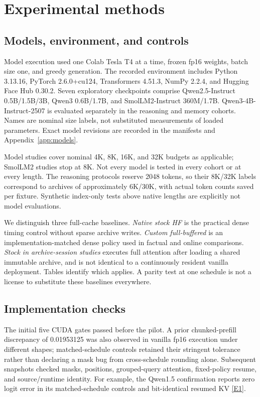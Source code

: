 \documentclass[11pt,letterpaper]{article}
\newcommand{\ev}[1]{\hyperref[app:evidence]{[E#1]}}
\begin{document}
\section{Experimental methods}
\subsection{Models, environment, and controls}
Model execution used one Colab Tesla T4 at a time, frozen fp16 weights, batch size one, and greedy generation. The recorded environment includes Python 3.13.16, PyTorch 2.6.0+cu124, Transformers 4.51.3, NumPy 2.2.4, and Hugging Face Hub 0.30.2. Seven exploratory checkpoints comprise Qwen2.5-Instruct 0.5B/1.5B/3B, Qwen3 0.6B/1.7B, and SmolLM2-Instruct 360M/1.7B. Qwen3-4B-Instruct-2507 is evaluated separately in the reasoning and memory cohorts. Names are nominal size labels, not substituted measurements of loaded parameters. Exact model revisions are recorded in the manifests and Appendix~\ref{app:models}.

Model studies cover nominal 4K, 8K, 16K, and 32K budgets as applicable; SmolLM2 studies stop at 8K. Not every model is tested in every cohort or at every length. The reasoning protocols reserve 2048 tokens, so their 8K/32K labels correspond to archives of approximately 6K/30K, with actual token counts saved per fixture. Synthetic index-only tests above native lengths are explicitly not model evaluations.

We distinguish three full-cache baselines. \emph{Native stock HF} is the practical dense timing control without sparse archive writes. \emph{Custom full-buffered} is an implementation-matched dense policy used in factual and online comparisons. \emph{Stock in archive-session studies} executes full attention after loading a shared immutable archive, and is not identical to a continuously resident vanilla deployment. Tables identify which applies. A parity test at one schedule is not a license to substitute these baselines everywhere.

\subsection{Implementation checks}
The initial five CUDA gates passed before the pilot. A prior chunked-prefill discrepancy of 0.01953125 was also observed in vanilla fp16 execution under different shapes; matched-schedule controls retained their stringent tolerance rather than declaring a mask bug from cross-schedule rounding alone. Subsequent snapshots checked masks, positions, grouped-query attention, fixed-policy resume, and source/runtime identity. For example, the Qwen1.5 confirmation reports zero logit error in its matched-schedule controls and bit-identical resumed KV \ev{1}.
\end{document}
